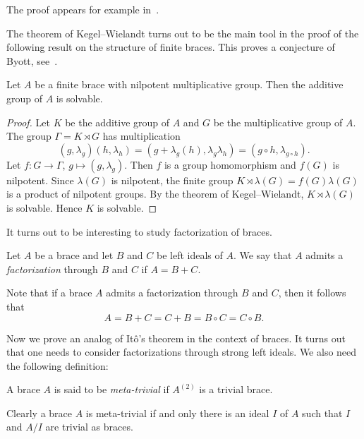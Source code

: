 The proof appears for example in~\cite[Theorem 2.4.3]{MR1211633}. 

The theorem of Kegel--Wielandt turns out to be the main tool in the proof of the following result 
on the structure of finite braces. 
This proves a conjecture 
of Byott, see~\cite{MR3425626}.

\begin{theorem}
\label{thm:mul_nilpotent}
Let $A$ be a finite brace with nilpotent multiplicative group. Then 
the additive group of $A$ is solvable.
\end{theorem}

\begin{proof}
    Let $K$ be the additive group of $A$ and $G$ be the multiplicative group of $A$. The group
    $\Gamma=K\rtimes G$ has multiplication
    \[
    (g,\lambda_g)(h,\lambda_h)=(g+\lambda_g(h),\lambda_g\lambda_h)=(g\circ h,\lambda_{g\circ h}).
    \]
    Let $f\colon G\to\Gamma$, $g\mapsto(g,\lambda_g)$. 
    Then $f$ is a group homomorphism and $f(G)$ is nilpotent. 
    Since $\lambda(G)$ is nilpotent, the finite group 
    $K\rtimes\lambda(G)=f(G)\lambda(G)$ is a product of nilpotent groups. 
    By the theorem of Kegel--Wielandt, $K\rtimes\lambda(G)$ 
    is solvable. Hence $K$ is solvable. 
\end{proof}


It turns out to be interesting to study factorization of braces. 

\begin{definition}
    Let $A$ be a brace and let $B$ and $C$ be left ideals of $A$. We say
    that $A$ admits a \emph{factorization} through $B$ and $C$ if $A=B+C$.
\end{definition}

Note that if a brace $A$ admits a factorization through $B$ and $C$, then  
it follows that
\[
A=B+C=C+B=B\circ C=C\circ B.
\]

Now we prove an analog of It\^o's theorem in the context of braces. 
It turns out that one needs to consider factorizations through strong left ideals. We also need
the following
definition: 

\begin{definition}
A brace $A$ is said to be \emph{meta-trivial} if $A^{(2)}$ is a trivial brace. 
\end{definition}

Clearly a brace $A$ is meta-trivial if and only there is 
an ideal $I$ of $A$ such that $I$ and $A/I$ are trivial as braces.

